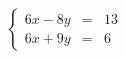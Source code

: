 \documentclass[preview]{standalone}
\begin{document}
\begin{align*}
\left\{ \begin{array}{rcl} 6x - 8y & = & 13 \\6x + 9y & = & 6 \end{array} \right.
\end{align*}
\end{document}

